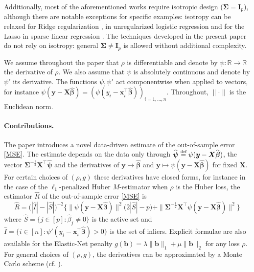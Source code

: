 \documentclass[11pt]{amsart}
\numberwithin{equation}{section}
\numberwithin{equation}{section}
\def\real{{\mathbb{R}}}
\def\R{{\real}}
\def\mathbold{\boldsymbol} %
\def\bb{\mathbold{b}}\def\bhat{\widehat{b}}\def\btil{\widetilde{b}}
\def\bI{\mathbold{I}}\def\hbI{{\widehat{\bI}}}\def\tbI{{\widetilde{\bI}}}
\def\bx{\mathbold{x}}\def\xhat{\widehat{x}}\def\xtil{\widetilde{x}}\def\xbar{{\overline x}}\def\vbx{{\bf x}}
\def\bX{\mathbold{X}}\def\hbX{{\widehat{\bX}}}\def\tbX{{\widetilde{\bX}}}\def\bXbar{{\overline \bX}}
\def\by{\mathbold{y}}\def\yhat{\widehat{y}}\def\ytil{\widetilde{y}}\def\ybar{{\overline y}}\def\vby{{\bf y}}
\def\bbeta{\mathbold{\beta}}\def\betahat{\widehat{\beta}}\def\hbeta{\widehat{\beta}}
\def\hbbeta{{{\widehat{\bbeta}}}}
\def\bSigma{\mathbold{\Sigma}}\def\hbSigma{{\widehat{\bSigma}}}
\def\bpsi{\mathbold{\psi}}\def\psihat{\widehat{\psi}}\def\hpsi{\widehat{\psi}}
\def\hbpsi{{\widehat{\bpsi}}}\def\tbpsi{{\widetilde{\bpsi}}}
\def\defas{\stackrel{\text{\tiny def}}{=}}
\begin{document}
Additionally, most of the aforementioned works 
require isotropic design ($\bSigma=\bI_p$),
although there are notable exceptions for specific examples:
isotropy can be relaxed for Ridge regularization \cite{dobriban2018high},
in unregularized logistic regression \cite{zhao2020asymptotic}
and for the Lasso in sparse linear regression \cite{celentano2020lasso}.
The techniques developed in the present paper
do not rely on isotropy: general $\bSigma\ne\bI_p$ is allowed
without additional complexity.

We assume throughout the paper that $\rho$ is differentiable
and denote by $\psi:\R\to\R$ the derivative of $\rho$.
We also assume that $\psi$ is absolutely continuous and denote by
$\psi'$ its derivative. The functions $\psi,\psi'$
act componentwise when applied to vectors,
for instance $\psi(\by-\bX\hbbeta)=(\psi(y_i-\bx_i^\top\hbbeta))_{i=1,...,n}$.
Throughout, $\|\cdot\|$ is the Euclidean norm.

\paragraph{Contributions.}


The paper introduces a novel data-driven
        estimate of the out-of-sample 
        error \eqref{MSE}.
        The estimate depends on
        the data only through
        $\hbpsi \defas \psi(\by-\bX\hbbeta)$, the vector
        $\bSigma^{-\frac12}\bX^\top\hbpsi$
        and the derivatives of
        $\by\mapsto \hbbeta$
        and $\by \mapsto \psi(\by-\bX\hbbeta)$
        for fixed $\bX$.
        For certain choices of $(\rho,g)$ these derivatives
        have closed forms, for instance in the case of
        the $\ell_1$-penalized Huber $M$-estimator
        when $\rho$ is the Huber loss,
        the estimator $\hat R$ of the out-of-sample error
        \eqref{MSE} is
        $$\hat R
        = \big(|\hat I| - |\hat S|)^{-2}
        \big\{
            \|\psi(\by-\bX\hbbeta)\|^2
            \big(2|\hat S| -p\big)
            + \|\bSigma^{-\frac12}\bX^\top
               \psi(\by-\bX\hbbeta)
            \|^2
        \big\}
        $$
        where $\hat S =\{j\in[p]:\hbeta_j\ne 0\}$ is the active set
        and $\hat I = \{i\in [n]: \psi'(y_i-\bx_i^\top\hbbeta) > 0\}$
        is the set of inliers.
        Explicit formulae are also available for
        the Elastic-Net penalty $g(\bb)=\lambda\|\bb\|_1 + \mu\|\bb\|_2$
        for any loss $\rho$.
        For general choices of $(\rho,g)$, the derivatives
        can be approximated by a Monte Carlo scheme
        (cf. ).
\end{document}
